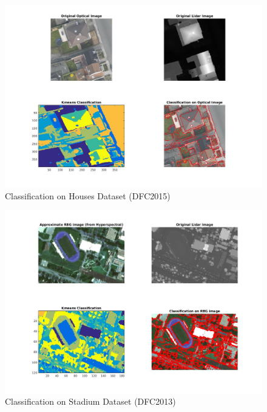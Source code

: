 \begin{figure}
  \includegraphics[width = \textwidth]{House(DFC2015).jpg}
  \caption{Classification on Houses Dataset (DFC2015)}
\end{figure}

\begin{figure}
  \includegraphics[width = \textwidth]{Stadium(DFC2013).jpg}
  \caption{Classification on Stadium Dataset (DFC2013)}
\end{figure}


